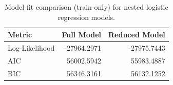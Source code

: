 \begin{table}[H]
\begin{center}
\begin{tabular}{lrr}
\toprule
Metric & Full Model & Reduced Model \\
\midrule
Log-Likelihood & -27964.2971 & -27975.7443 \\
AIC & 56002.5942 & 55983.4887 \\
BIC & 56346.3161 & 56132.1252 \\
\bottomrule
\end{tabular}
\end{center}
\vspace{-5pt}
\caption{Model fit comparison (train-only) for nested logistic regression models.}
\label{tab:model_fit_full_vs_reduced}
\end{table}
